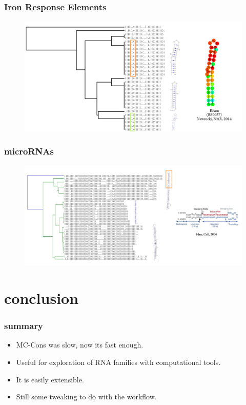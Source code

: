 \documentclass{beamer}
\begin{document}
\begin{frame}
	\frametitle{Iron Response Elements}
	\begin{figure}
	\centering
	\includegraphics[scale=0.25]{figs/iresCons}
	\end{figure}
	
\end{frame}



\begin{frame}
	\frametitle{microRNAs}
	\begin{figure}
	\centering
	\includegraphics[scale=0.21]{figs/miRNACons}
	\end{figure}
	
\end{frame}


\section{conclusion}


\begin{frame}
	\frametitle{summary}
	
	\begin{itemize}
		\item MC-Cons was slow, now its fast enough.
		\item Useful for exploration of RNA families with computational tools.
		\item It is easily extensible.
		\item Still some tweaking to do with the workflow.
	\end{itemize}

\end{frame}
\end{document}
